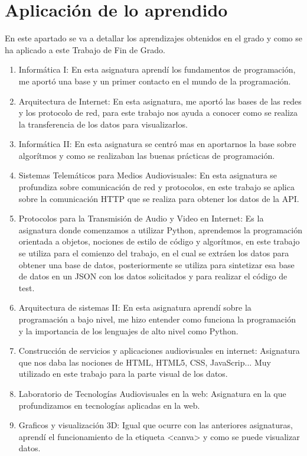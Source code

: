 \documentclass[a4paper, 12pt]{book}
\begin{document}

\section{Aplicación de lo aprendido}
\label{sec:aplicacion}

En este apartado se va a detallar los aprendizajes obtenidos en el grado y como se ha aplicado a este Trabajo de Fin de Grado.

\begin{enumerate}
  \item Informática I: En esta asignatura aprendí los fundamentos de programación, me aportó una base y un primer contacto en el mundo de la programación.
  \item Arquitectura de Internet: En esta asignatura, me aportó las bases de las redes y los protocolo de red, para este trabajo nos ayuda a conocer como se realiza la transferencia de los datos para visualizarlos.
  \item Informática II: En esta asignatura se centró mas en aportarnos la base sobre algorítmos y como se realizaban las buenas prácticas de programación.
  \item Sistemas Telemáticos para Medios Audiovisuales: En esta asignatura se profundiza sobre comunicación de red y protocolos, en este trabajo se aplica sobre la comunicación HTTP que se realiza para obtener los datos de la API.
  \item Protocolos para la Transmisión de Audio y Video en Internet: Es la asignatura donde comenzamos a utilizar Python, aprendemos la programación orientada a objetos, nociones de estilo de código y algorítmos, en este trabajo se utiliza para el comienzo del trabajo, en el cual se extráen los datos para obtener una base de datos, posteriormente se utiliza para sintetizar esa base de datos en un JSON con los datos solicitados y para realizar el código de test.
  \item Arquitectura de sistemas II: En esta asignatura aprendí sobre la programación a bajo nivel, me hizo entender como funciona la programación y la importancia de los lenguajes de alto nivel como Python.
  \item Construcción de servicios y aplicaciones audiovisuales en internet: Asignatura que nos daba las nociones de HTML, HTML5, CSS, JavaScrip... Muy utilizado en este trabajo para la parte visual de los datos.
  \item Laboratorio de Tecnologías Audiovisuales en la web: Asignatura en la que profundizamos en tecnologías aplicadas en la web.
  \item Graficos y visualización 3D: Igual que ocurre con las anteriores asignaturas, aprendí el funcionamiento de la etiqueta <canva> y como se puede visualizar datos.
\end{enumerate}
\end{document}

